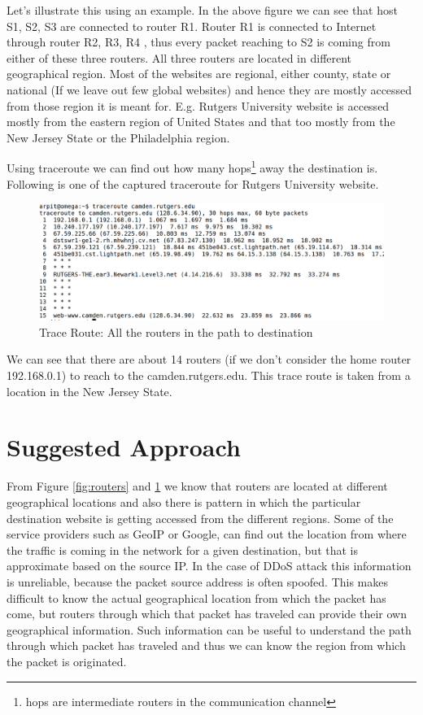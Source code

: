 \documentclass[10pt,oneside,a4paper]{article}
\begin{document}
Let's illustrate this using an example. In the above figure we can see that host S1, S2, S3 are connected to router R1. Router R1 is connected to Internet through router R2, R3, R4 , thus every packet reaching to S2 is coming from either of these three routers. All three routers are located in different geographical region. Most of the websites are regional, either county, state or national (If we leave out few global websites) and hence they are mostly accessed from those region it is meant for. E.g. Rutgers University website is accessed mostly from the eastern region of United States and that too mostly from the New Jersey State or the Philadelphia region.\par
Using traceroute we can find out how many hops\footnote{hops are intermediate routers in the communication channel} away the destination is. Following is one of the captured traceroute for Rutgers University website.\par
\begin{figure}[H]
\centering
\includegraphics[width=\textwidth]{TraceRoute.png}
\caption{Trace Route: All the routers in the path to destination} \label{fig:traceroute}
\end{figure}

We can see that there are about 14 routers (if we don't consider the home router 192.168.0.1) to reach to the camden.rutgers.edu. This trace route is taken from a location in the New Jersey State.\par

\section{Suggested Approach}

From Figure \ref{fig:routers} and \ref{fig:traceroute} we know that routers are located at different geographical locations and also there is pattern in which the particular destination website is getting accessed from the different regions. Some of the service providers such as  GeoIP or Google, can find out the location from where the traffic is coming in the network for a given destination, but that is approximate based on the source IP. In the case of DDoS attack this information is unreliable, because the packet source address is often spoofed. This makes difficult to know the actual geographical location from which the packet has come, but routers through which that packet has traveled can provide their own geographical information. Such information can be useful to understand the path through which packet has traveled and thus we can know the region from which the packet is originated.\par
\end{document}
